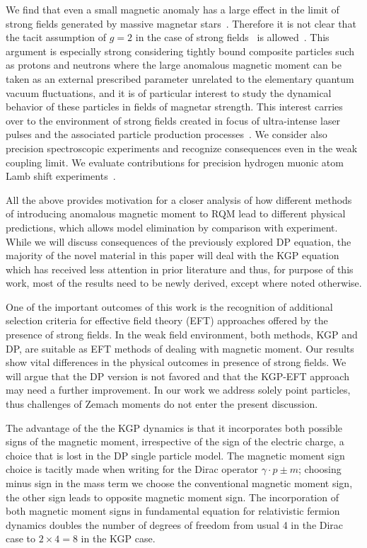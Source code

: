 \documentclass[epj]{svjour}
\begin{document}
We find that even a small magnetic anomaly has a large effect in the limit of strong fields generated by massive magnetar stars~\cite{Kaspi:2017fwg}. Therefore it is not clear that the tacit assumption of $g=2$ in the case of strong fields~\cite{Rafelski:1976ts,Greiner:1985ce,Rafelski:2016ixr} is allowed~\cite{Evans:2018kor}. This argument is especially strong considering tightly bound composite particles such as protons and neutrons where the large anomalous magnetic moment can be taken as an external prescribed parameter unrelated to the elementary quantum vacuum fluctuations, and it is of particular interest to study the dynamical behavior of these particles in fields of magnetar strength. This interest carries over to the environment of strong fields created in focus of ultra-intense laser pulses and the associated particle production processes~\cite{Dunne:2014qda,Hegelich:2014tda}. We consider also precision spectroscopic experiments and recognize consequences even in the weak coupling limit. We evaluate contributions for precision hydrogen muonic atom Lamb shift experiments~\cite{Pohl:2013yb}. 

All the above provides motivation for a closer analysis of how different methods of introducing anomalous magnetic moment to RQM lead to different physical predictions, which allows model elimination by comparison with experiment. While we will discuss consequences of the previously explored DP equation, the majority of the novel material in this paper will deal with the KGP equation which has received less attention in prior literature and thus, for purpose of this work, most of the results need to be newly derived, except where noted otherwise.

One of the important outcomes of this work is the recognition of additional selection criteria for effective field theory (EFT) approaches offered by the presence of strong fields. In the weak field environment, both methods, KGP and DP, are suitable as EFT methods of dealing with magnetic moment. Our results show vital differences in the physical outcomes in presence of strong fields. We will argue that the DP version is not favored and that the KGP-EFT approach may need a further improvement. In our work we address solely point particles, thus challenges of Zemach moments \cite{Zemach:1956zz} do not enter the present discussion. 

The advantage of the the KGP dynamics is that it incorporates both possible signs of the magnetic moment, irrespective of the sign of the electric charge, a choice that is lost in the DP single particle model. The magnetic moment sign choice is tacitly made when writing for the Dirac operator $\gamma\cdot p \pm m$; choosing minus sign in the mass term we choose the conventional magnetic moment sign, the other sign leads to opposite magnetic moment sign. The incorporation of both magnetic moment signs in fundamental equation for relativistic fermion dynamics doubles the number of degrees of freedom from usual 4 in the Dirac case to $2\times 4=8$ in the KGP case.
\end{document}
